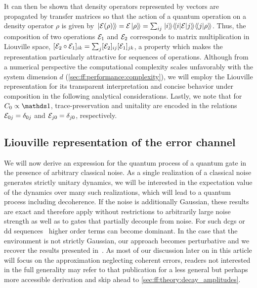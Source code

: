 It can then be shown that density operators represented by vectors are propagated by transfer matrices so that the action of a quantum operation \qp on a density operator $\rho$ is given by $\dket{\qp(\rho)} = \qp\dket{\rho} = \sum_{ij}\dket{i}\dmel{i}{\qp}{j}\dip{j}{\rho}$.
Thus, the composition of two operations $\mathcal{E}_1$ and $\mathcal{E}_2$ corresponds to matrix multiplication in Liouville space, $[\mathcal{E}_2\circ\mathcal{E}_1]_{ik} = \sum_j[\mathcal{E}_2]_{ij}[\mathcal{E}_1]_{jk}$, a property which makes the representation particularly attractive for sequences of operations.
Although from a numerical perspective the computational complexity scales unfavorably with the system dimension $d$ (\cf \cref{sec:ff:performance:complexity}),  we will employ the Liouville representation for its transparent interpretation and concise behavior under composition in the following analytical considerations.
Lastly, we note that for $C_0\propto\eye$, trace-preservation and unitality are encoded in the relations $\mathcal{E}_{0j} = \delta_{0j}$ and $\mathcal{E}_{j0} = \delta_{j0}$, respectively.

\subsection{Liouville representation of the error channel}\label{subsec:ff:theory:transfer_matrix:derivation}
We will now derive an expression for the quantum process of a quantum gate in the presence of arbitrary classical noise.
As a single realization of a classical noise generates strictly unitary dynamics, we will be interested in the expectation value of the dynamics over many such realizations, which will lead to a quantum process including decoherence.
If the noise is additionally Gaussian, these results are exact and therefore apply without restrictions to arbitrarily large noise strength as well as to gates that partially decouple from noise.
For such \glspl{dcg} or \gls{dd} sequences~\cite{Khodjasteh2009,Cywinski2008} higher order terms can become dominant.
In the case that the environment is not strictly Gaussian, our approach becomes perturbative and we recover the results presented in~.
As most of our discussion later on in this article will focus on the approximation neglecting coherent errors, readers not interested in the full generality may refer to that publication for a less general but perhaps more accessible derivation and skip ahead to \cref{sec:ff:theory:decay_amplitudes}.

